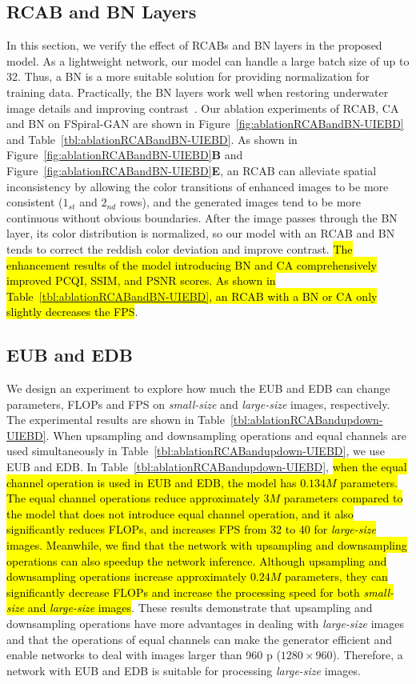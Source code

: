 \documentclass[utf8]{FrontiersinHarvard} %
\begin{document}
\subsection{RCAB and BN Layers}
In this section, we verify the effect of RCABs and BN layers in the proposed model. As a lightweight network, our model can handle a large batch size of up to 32. Thus, a BN is a more suitable solution for providing normalization for training data. Practically, the BN layers work well when restoring underwater image details and improving contrast~\citep{2019Underwater}. Our ablation experiments of RCAB, CA and BN on FSpiral-GAN are shown in Figure~\ref{fig:ablationRCABandBN-UIEBD} and Table~\ref{tbl:ablationRCABandBN-UIEBD}. As shown in Figure~\ref{fig:ablationRCABandBN-UIEBD}\textbf{B} and Figure~\ref{fig:ablationRCABandBN-UIEBD}\textbf{E}, an RCAB can alleviate spatial inconsistency by allowing the color transitions of enhanced images to be more consistent ($1_{st}$ and $2_{nd}$ rows), and the generated images tend to be more continuous without obvious boundaries. After the image passes through the BN layer, its color distribution is normalized, so our model with an RCAB and BN tends to correct the reddish color deviation and improve contrast. \hl{The enhancement results of the model introducing BN and CA comprehensively improved PCQI, SSIM, and PSNR scores. As shown in Table~\ref{tbl:ablationRCABandBN-UIEBD}, an RCAB with a BN or CA only slightly decreases the FPS}.

\subsection{EUB and EDB}
We design an experiment to explore how much the EUB and EDB can change parameters, FLOPs and FPS on \textit{small-size} and \textit{large-size} images, respectively. The experimental results are shown in Table~\ref{tbl:ablationRCABandupdown-UIEBD}. When upsampling and downsampling operations and equal channels are used simultaneously in Table~\ref{tbl:ablationRCABandupdown-UIEBD}, we use EUB and EDB. In Table~\ref{tbl:ablationRCABandupdown-UIEBD}, \hl{when the equal channel operation is used in EUB and EDB, the model has $0.134M$ parameters. The equal channel operations reduce approximately $3M$ parameters compared to the model that does not introduce equal channel operation, and it also significantly reduces FLOPs, and increases FPS from 32 to 40 for \textit{large-size} images. Meanwhile, we find that the network with upsampling and downsampling operations can also speedup the network inference. Although upsampling and downsampling operations increase approximately $0.24M$ parameters, they can significantly decrease FLOPs and increase the processing speed for both \textit{small-size} and \textit{large-size} images}. These results demonstrate that upsampling and downsampling operations have more advantages in dealing with \textit{large-size} images and that the operations of equal channels can make the generator efficient and enable networks to deal with images larger than 960 p ($1280\times960$). Therefore, a network with EUB and EDB is suitable for processing \textit{large-size} images.
\end{document}

